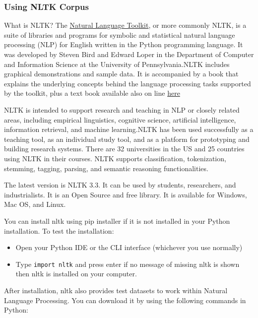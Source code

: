 \documentclass[11pt]{article}
\providecommand{\tightlist}{%
      \setlength{\itemsep}{0pt}\setlength{\parskip}{0pt}}
\begin{document}
    \hypertarget{using-nltk-corpus}{%
\subsubsection{Using NLTK Corpus}\label{using-nltk-corpus}}

    What is NLTK? The \href{https://www.nltk.org/}{Natural Language
Toolkit}, or more commonly NLTK, is a suite of libraries and programs
for symbolic and statistical natural language processing (NLP) for
English written in the Python programming language. It was developed by
Steven Bird and Edward Loper in the Department of Computer and
Information Science at the University of Pennsylvania.NLTK includes
graphical demonstrations and sample data. It is accompanied by a book
that explains the underlying concepts behind the language processing
tasks supported by the toolkit, plus a text book available also on line
\href{https://www.nltk.org/book/}{here}

NLTK is intended to support research and teaching in NLP or closely
related areas, including empirical linguistics, cognitive science,
artificial intelligence, information retrieval, and machine
learning.NLTK has been used successfully as a teaching tool, as an
individual study tool, and as a platform for prototyping and building
research systems. There are 32 universities in the US and 25 countries
using NLTK in their courses. NLTK supports classification, tokenization,
stemming, tagging, parsing, and semantic reasoning functionalities.

The latest version is NLTK 3.3. It can be used by students, researchers,
and industrialists. It is an Open Source and free library. It is
available for Windows, Mac OS, and Linux.

You can install nltk using pip installer if it is not installed in your
Python installation. To test the installation:

\begin{itemize}
\tightlist
\item
  Open your Python IDE or the CLI interface (whichever you use normally)
\item
  Type \texttt{import\ nltk} and press enter if no message of missing
  nltk is shown then nltk is installed on your computer.
\end{itemize}

After installation, nltk also provides test datasets to work within
Natural Language Processing. You can download it by using the following
commands in Python:
\end{document}
